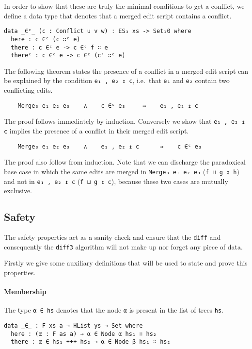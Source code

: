 \documentclass[preprint]{sigplanconf}
\begin{document}
    In order to show that these are truly the minimal conditions to get a conflict,
    we define a data type that denotes that a merged edit script contains a 
    conflict. 

\begin{verbatim}
data _∈ᶜ_ (c : Conflict u v w) : ES₃ xs -> Set₁0 where
  here : c ∈ᶜ (c ∷ᶜ e)
  there : c ∈ᶜ e -> c ∈ᶜ f ∷ e
  thereᶜ : c ∈ᶜ e -> c ∈ᶜ (c' ∷ᶜ e)
\end{verbatim}

    The following theorem states the presence of a conflict in a merged
    edit script can be explained by the condition \texttt{e₁ , e₂ ↥ c}, i.e.\
    that \texttt{e₁} and \texttt{e₂} contain two conflicting edits.

\begin{verbatim}
    Merge₃ e₁ e₂ e₃    ∧    c ∈ᶜ e₃     ⇒    e₁ , e₂ ↥ c
\end{verbatim}
    The proof follows immediately by induction.
    Conversely we show that \texttt{e₁ , e₂ ↥ c} implies the presence
    of a conflict in their merged edit script.
\begin{verbatim}
    Merge₃ e₁ e₂ e₃    ∧    e₁ , e₂ ↥ c      ⇒    c ∈ᶜ e₃
\end{verbatim}
    The proof also follow from induction. Note that we can discharge the paradoxical
    base case in which the same edits are merged in \texttt{Merge₃ e₁ e₂ e₃}
    (\texttt{f ⊔ g ↧ h}) and not in \texttt{e₁ , e₂ ↥ c} (\texttt{f ⊔ g ↥ c}),
    because these two cases are mutually exclusive.    

    \subsection{Safety}
    The safety properties act as a sanity check and ensure that the \texttt{diff} 
    and consequently the  \texttt{diff3} algorithm will not make up nor forget any 
    piece of data.

    Firstly we give some auxiliary definitions that will be used to state and prove
    this properties.

    \paragraph{Membership}
    The type \texttt{α ∈ hs} denotes that the node \texttt{α} is present
    in the list of trees \texttt{hs}.

\begin{verbatim}
data _∈_ : F xs a → HList ys → Set where
  here : (α : F as a) → α ∈ Node α hs₁ ∷ hs₂
  there : α ∈ hs₁ +++ hs₂ → α ∈ Node β hs₁ ∷ hs₂
\end{verbatim}
\end{document}
